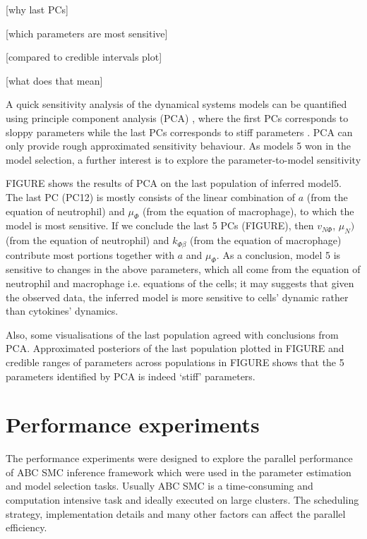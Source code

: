 \documentclass[12pt,a4paper]{report}
\begin{document}
[why last PCs]

[which parameters are most sensitive]

[compared to credible intervals plot]

[what does that mean]

A quick sensitivity analysis of the dynamical systems models can be quantified using principle component analysis (PCA) \cite{Toni}, where the first PCs corresponds to sloppy parameters while the last PCs corresponds to stiff parameters \cite{sensitivity}. PCA can only provide rough approximated sensitivity behaviour. As models 5 won in the model selection, a further interest is to explore the parameter-to-model sensitivity

FIGURE shows the results of PCA on the last population of inferred model5. The last PC (PC12) is mostly consists of the linear combination of $a$ (from the equation of neutrophil) and $\mu_\Phi$ (from the equation of macrophage), to which the model is most sensitive. If we conclude the last 5 PCs (FIGURE), then $v_{N\Phi}$, $\mu_N)$ (from the equation of neutrophil) and $k_{\Phi\beta}$ (from the equation of macrophage) contribute most portions together with $a$ and $\mu_\Phi$. As a conclusion, model 5 is sensitive to changes in the above parameters, which all come from the equation of neutrophil and macrophage i.e. equations of the cells; it may suggests that given the observed data, the inferred model is more sensitive to cells' dynamic rather than cytokines' dynamics.

Also, some visualisations of the last population agreed with conclusions from PCA. Approximated posteriors of the last population plotted in FIGURE and credible ranges of parameters across populations in FIGURE shows that the 5 parameters identified by PCA is indeed `stiff' parameters.












\chapter{Performance experiments}

The performance experiments were designed to explore the parallel performance of ABC SMC inference framework which were used in the parameter estimation and model selection tasks. Usually ABC SMC is a time-consuming and computation intensive task and ideally executed on large clusters. The scheduling strategy, implementation details and many other factors can affect the parallel efficiency.
\end{document}
